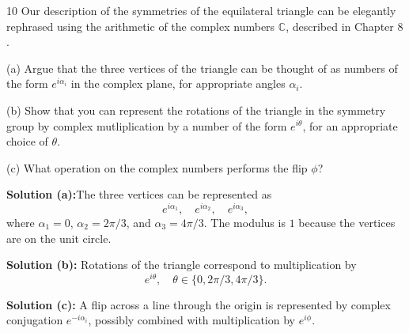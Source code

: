 \begin{problem}{10}
    Our description of the symmetries of the equilateral 
    triangle can be elegantly rephrased using the 
    arithmetic of the complex numbers $\mathbb{C}$,
    described in Chapter $8$.

    (a) Argue that the three vertices of the triangle can be thought 
        of as numbers of the form $e^{i \alpha_i}$ in the 
        complex plane, for appropriate angles $\alpha_i$.

    (b) Show that you can represent the rotations of the triangle 
        in the symmetry group by complex mutliplication by a 
        number of the form $e^{i \theta}$, for an 
        appropriate choice of $\theta$.

    (c) What operation on the complex numbers performs the flip 
        $\phi$?
\end{problem}
\solved

\textbf{Solution (a):}The three vertices can be represented as
\[
e^{i \alpha_1}, \quad e^{i \alpha_2}, \quad e^{i \alpha_3},
\]
where $\alpha_1 = 0$, $\alpha_2 = 2\pi/3$, and $\alpha_3 = 4\pi/3$.  
The modulus is $1$ because the vertices are on the unit circle.

\textbf{Solution (b):}
Rotations of the triangle correspond to multiplication by 
\[
e^{i \theta}, \quad \theta \in \{0, 2\pi/3, 4\pi/3\}.
\] 

\textbf{Solution (c):}
A flip across a line through the origin is represented by complex conjugation $e^{-i \alpha_i}$, 
possibly combined with multiplication by $e^{i \phi}$.
